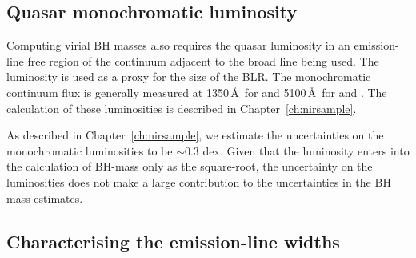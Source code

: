 \subsection{Quasar monochromatic luminosity}

Computing virial BH masses also requires the quasar luminosity in an emission-line free region of the continuum adjacent to the broad line being used. 
The luminosity is used as a proxy for the size of the BLR. 
The monochromatic continuum flux is generally measured at 1350\,\AA\ for  and 5100\,\AA\, for \ha and \hbns. 
The calculation of these luminosities is described in Chapter~\ref{ch:nirsample}. 

As described in Chapter~\ref{ch:nirsample}, we estimate the uncertainties on the monochromatic luminosities to be $\sim$0.3 dex. 
Given that the luminosity enters into the calculation of BH-mass only as the square-root, the uncertainty on the luminosities does not make a large contribution to the uncertainties in the BH mass estimates.  

\subsection{Characterising the emission-line widths}
\label{sub:charemprof}

